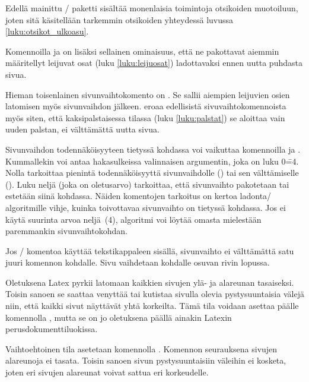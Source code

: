 Edellä mainittu \-/ paketti sisältää monenlaisia
toimintoja otsikoiden muotoiluun, joten sitä käsitellään tarkemmin
otsikoiden yhteydessä luvussa \ref{luku:otsikot_ulkoasu}.

Komennoilla  ja  on lisäksi
sellainen ominaisuus, että ne pakottavat aiemmin määritellyt leijuvat
osat (luku \ref{luku:leijuosat}) ladottavaksi ennen uutta puhdasta
sivua.

Hieman toisenlainen sivunvaihtokomento on . Se sallii
aiempien leijuvien osien latomisen myös sivunvaihdon jälkeen.
 eroaa edellisistä sivuvaihtokomennoista myös siten,
että kaksipalstaisessa tilassa (luku \ref{luku:palstat}) se aloittaa
vain uuden palstan, ei välttämättä uutta sivua.

Sivunvaihdon todennäköisyyteen tietyssä kohdassa voi vaikuttaa
komennoilla  ja . Kummallekin
voi antaa hakasulkeissa valinnaisen argumentin, joka on luku 0\==4.
Nolla tarkoittaa pienintä todennäköisyyttä sivunvaihdolle
() tai sen välttämiselle
(). Luku neljä (joka on oletusarvo)
tarkoittaa, että sivunvaihto pakotetaan tai estetään siinä kohdassa.
Näiden komentojen tarkoitus on kertoa ladonta\-/ algoritmille vihje,
kuinka toivottavaa sivunvaihto on tietyssä kohdassa. Jos ei käytä
suurinta arvoa neljä~(4), algoritmi voi löytää omasta mielestään
paremmankin sivunvaihtokohdan.

\begin{koodilohkosis}
\pagebreak[3]  %
\nopagebreak   %
\end{koodilohkosis}

Jos \-/ komentoa käyttää tekstikappaleen sisällä,
sivunvaihto ei välttämättä satu juuri komennon kohdalle. Sivu vaihdetaan
kohdalle osuvan rivin lopussa.

Oletuksena Latex pyrkii latomaan kaikkien sivujen ylä- ja alareunan
tasaiseksi. Toisin sanoen se saattaa venyttää tai kutistaa sivulla
olevia pystysuuntaisia välejä niin, että kaikki sivut näyttävät yhtä
korkeilta. Tämä tila voidaan asettaa päälle komennolla
, mutta se on jo oletuksena päällä ainakin Latexin
perusdokumenttiluokissa.

Vaihtoehtoinen tila asetetaan komennolla .
Komennon seurauksena sivujen alareunoja ei tasata. Toisin sanoen sivun
pystysuuntaisiin väleihin ei kosketa, joten eri sivujen alareunat voivat
sattua eri korkeudelle.

